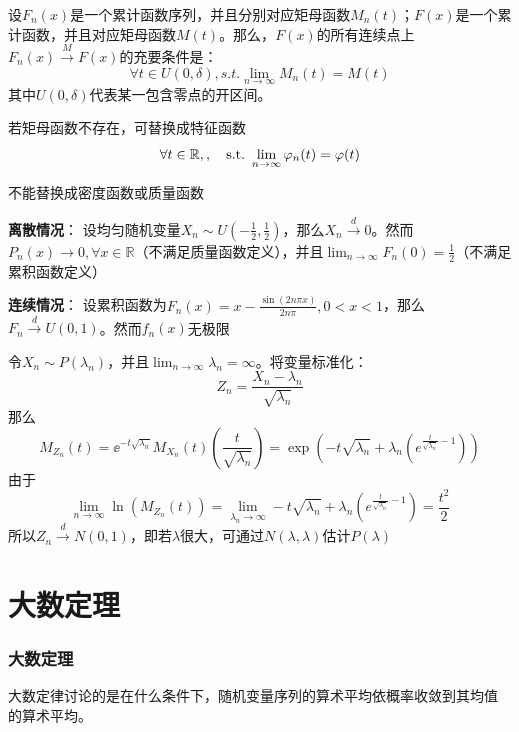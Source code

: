 \begin{theorem}[连续性定理]\label{thm:continuity}
    设$F_n(x)$是一个累计函数序列，并且分别对应矩母函数$M_n(t)$；$F(x)$是一个累计函数，并且对应矩母函数$M(t)$。那么，$F(x)$的所有连续点上$F_n(x) \xrightarrow{M} F(x)$的充要条件是：
    \[ \forall t \in U(0,\delta) ,s.t. \lim_{n \to \infty}M_n(t) = M(t)\]
    其中$U(0,\delta)$代表某一包含零点的开区间。

    若矩母函数不存在，可替换成特征函数
    \[ \forall t \in \mathbb{R} ,,\quad \mathrm{s.t.}\  \lim_{n \to \infty}\varphi_n(t) = \varphi(t)\]
\end{theorem}
\begin{remark}
    不能替换成密度函数或质量函数
\end{remark}

\begin{example}
    \textbf{离散情况}：
    设均匀随机变量$X_n \sim U(-\frac1{2},\frac1{2})$，那么$X_n \xrightarrow{d} 0$。然而$P_n(x) \to 0, \forall x \in \mathbb{R}$（不满足质量函数定义），并且$\lim_{n \to \infty}F_n(0)=\frac1{2}$（不满足累积函数定义）

    \textbf{连续情况}：
    设累积函数为$F_n(x)=x-\frac{\sin(2n\pi x)}{2n\pi}, 0<x<1$，那么$F_n \xrightarrow{d} U(0,1)$。然而$f_n(x)$无极限
\end{example}

\begin{example}[泊松分布收敛于正态分布]
    令$X_n \sim P(\lambda_n)$，并且$\lim_{n \to \infty}\lambda_n =\infty$。将变量标准化：
    \[ Z_n=\frac{X_n-\lambda_n}{\sqrt{\lambda_n}} \]
    那么
    \[M_{Z_n}(t)=\ee^{-t\sqrt{\lambda_n}}M_{X_n}(t)(\frac{t}{\sqrt{\lambda_n}})=\exp(-t\sqrt{\lambda_n}+\lambda_n(e^{\frac{t}{\sqrt{\lambda_n}}-1}))\]
    由于
    \[ \lim_{n \to \infty}\ln(M_{Z_n}(t))=\lim_{\lambda_n \to \infty}-t\sqrt{\lambda_n}+\lambda_n(e^{\frac{t}{\sqrt{\lambda_n}}-1})=\frac{t^2}{2} \]
    所以$Z_n \xrightarrow{d} N(0,1)$，即若$\lambda$很大，可通过$N(\lambda,\lambda)$估计$P(\lambda)$
\end{example}

\section{大数定理}\label{sec:large_number}

\subsubsection{大数定理}

大数定律讨论的是在什么条件下，随机变量序列的算术平均依概率收敛到其均值
的算术平均。

